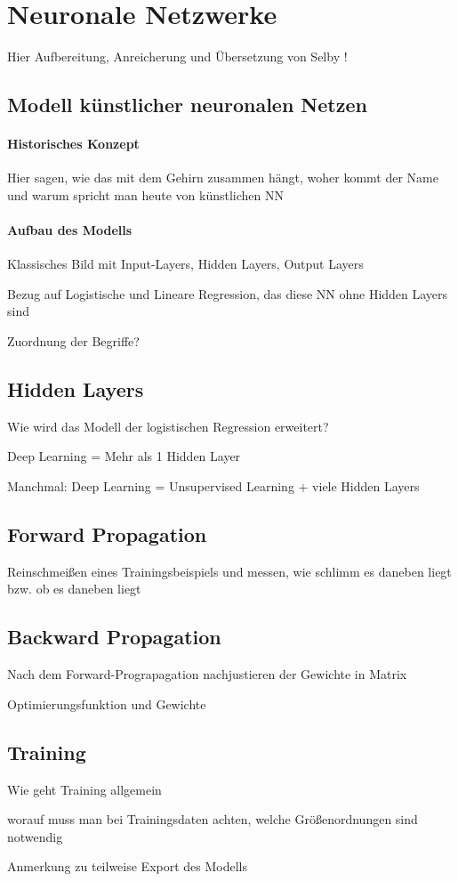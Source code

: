 \section{Neuronale Netzwerke}
\label{sec:NN}
Hier Aufbereitung, Anreicherung und Übersetzung von Selby \cite{SelbyNN}!
\subsection{Modell künstlicher neuronalen Netzen}
\paragraph{Historisches Konzept}
Hier sagen, wie das mit dem Gehirn zusammen hängt, woher kommt der Name und warum  spricht man heute von künstlichen NN
\paragraph{Aufbau des Modells}
Klassisches Bild mit Input-Layers, Hidden Layers, Output Layers

Bezug auf Logistische und Lineare Regression, das diese NN ohne Hidden Layers sind

Zuordnung der Begriffe?
\subsection{Hidden Layers}
Wie wird das Modell der logistischen Regression erweitert?

Deep Learning = Mehr als 1 Hidden Layer

Manchmal: Deep Learning = Unsupervised Learning + viele Hidden Layers
\subsection{Forward Propagation}
Reinschmeißen eines Trainingsbeispiels und messen, wie schlimm es daneben liegt bzw. ob es daneben liegt
\subsection{Backward Propagation}
Nach dem Forward-Prograpagation nachjustieren der Gewichte in Matrix

Optimierungsfunktion und Gewichte
\subsection{Training}
Wie geht Training allgemein 

worauf muss man bei Trainingsdaten achten, welche Größenordnungen sind notwendig

Anmerkung zu teilweise Export des Modells